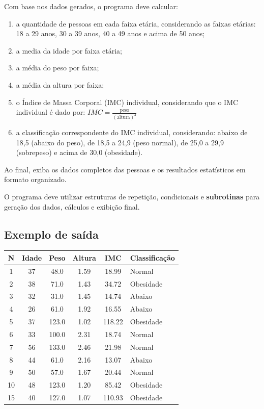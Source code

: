 \documentclass[11pt]{article}
\begin{document}
Com base nos dados gerados, o programa deve calcular:
\begin{enumerate}[label=\alph*)]
    \item a quantidade de pessoas em cada faixa etária, considerando as faixas etárias: 18 a 29 anos, 30 a 39 anos, 40 a 49 anos e acima de 50 anos;
    \item a media da idade por faixa etária;
    \item a média do peso por faixa; 
    \item a média da altura por faixa;
    \item o Índice de Massa Corporal (IMC) individual, considerando  
    que o IMC individual é dado por:
    \(
        IMC = \frac{\text{peso}}{(\text{altura})^2}
    \)
    \item a classificação correspondente do IMC individual, considerando: abaixo de 18,5 (abaixo do peso), de 18,5 a 24,9 (peso normal), de 25,0 a 29,9 (sobrepeso) e acima de 30,0 (obesidade).
\end{enumerate}


Ao final, exiba os dados completos das pessoas e os resultados estatísticos em formato organizado.

O programa deve utilizar estruturas de repetição, condicionais e \textbf{subrotinas} para geração dos dados, cálculos e exibição final.

\subsection*{Exemplo de saída}

\begin{center}
\small
\begin{tabular}{|c|c|c|c|c|l|}
\hline
N & Idade & Peso & Altura & IMC & Classificação \\ \hline
1  & 37 & 48.0  & 1.59 & 18.99 & Normal \\ \hline
2  & 38 & 71.0  & 1.43 & 34.72 & Obesidade \\ \hline
3  & 32 & 31.0  & 1.45 & 14.74 & Abaixo \\ \hline
4  & 26 & 61.0  & 1.92 & 16.55 & Abaixo \\ \hline
5  & 37 & 123.0 & 1.02 & 118.22 & Obesidade \\ \hline
6  & 33 & 100.0 & 2.31 & 18.74 & Normal \\ \hline
7  & 56 & 133.0 & 2.46 & 21.98 & Normal \\ \hline
8  & 44 & 61.0  & 2.16 & 13.07 & Abaixo \\ \hline
9  & 50 & 57.0  & 1.67 & 20.44 & Normal \\ \hline
10 & 48 & 123.0 & 1.20 & 85.42 & Obesidade \\ \hline
15 & 40 & 127.0 & 1.07 & 110.93 & Obesidade \\ \hline
\end{tabular}
\end{center}
\end{document}

